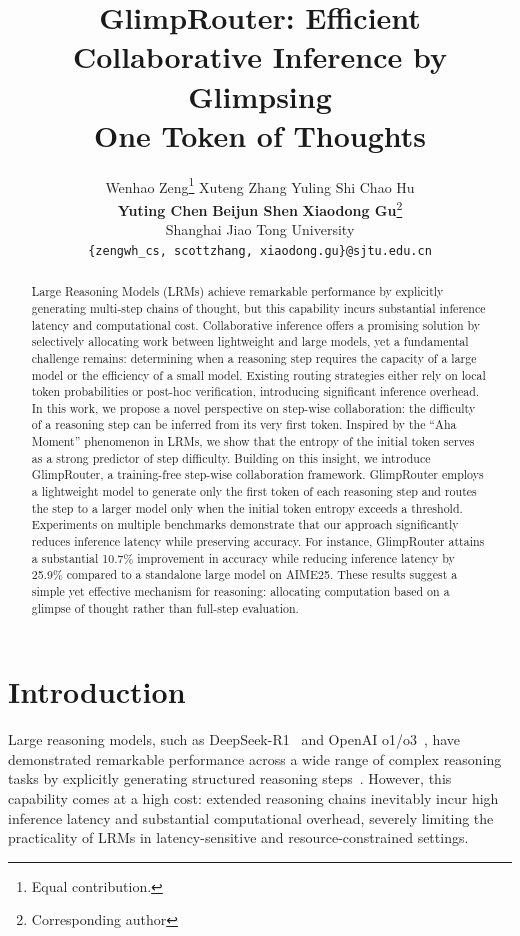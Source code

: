 \documentclass[11pt]{article}
\title{GlimpRouter: Efficient Collaborative Inference by Glimpsing \\
One Token of Thoughts}
\author{
  Wenhao Zeng\thanks{Equal contribution.}\quad
  Xuteng Zhang\footnotemark[1] \quad
  Yuling Shi \quad
  Chao Hu \quad \\
  \textbf{Yuting Chen} \quad
  \textbf{Beijun Shen} \quad
  \textbf{Xiaodong Gu}\thanks{Corresponding author} \\
  Shanghai Jiao Tong University \quad \\
  \texttt{\{zengwh\_cs, scottzhang, xiaodong.gu\}@sjtu.edu.cn}
}
\newcommand{\approach}{{GlimpRouter}\xspace}
\begin{document}
\maketitle
\begin{abstract}
Large Reasoning Models (LRMs) achieve remarkable performance by explicitly generating multi-step chains of thought, but this capability incurs substantial inference latency and computational cost. Collaborative inference offers a promising solution by selectively allocating work between lightweight and large models, yet a fundamental challenge remains: determining when a reasoning step requires the capacity of a large model or the efficiency of a small model. Existing routing strategies either rely on local token probabilities or post-hoc verification, introducing significant inference overhead.
In this work, we propose a novel perspective on step-wise collaboration: the difficulty of a reasoning step can be inferred from its very first token. Inspired by the ``Aha Moment'' phenomenon in LRMs, we show that the entropy of the initial token serves as a strong predictor of step difficulty. 
Building on this insight, we introduce \approach, a training-free step-wise collaboration framework. \approach employs a lightweight model to generate only the first token of each reasoning step and routes the step to a larger model only when the initial token entropy exceeds a threshold. Experiments on multiple benchmarks demonstrate that our approach significantly reduces inference latency while preserving accuracy. For instance, \approach attains a substantial 10.7\% improvement in accuracy while reducing inference latency by 25.9\% compared to a standalone large model on AIME25. These results suggest a simple yet effective mechanism for reasoning: allocating computation based on a glimpse of thought rather than full-step evaluation.
\end{abstract}





\section{Introduction}
\label{sec:introduction}

Large reasoning models, such as DeepSeek-R1~\cite{guo2025deepseek} and OpenAI o1/o3~\cite{jaech2024openai, openai2025o3}, have demonstrated remarkable performance across a wide range of complex reasoning tasks by explicitly generating structured reasoning steps~\cite{yang2025elaboration,wang2025vrag,wang2025vidorag,chen2025swe,li2025swe,hu2025flowmaltrans,zhang2025cf,zhang2025mmcot}. However, this capability comes at a high cost: extended reasoning chains inevitably incur high inference latency and substantial computational overhead, severely limiting the practicality of LRMs in latency-sensitive and resource-constrained settings.
\end{document}
